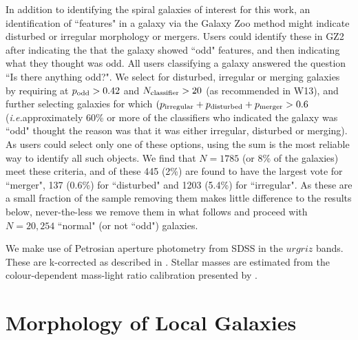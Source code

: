 \documentclass[usenatbib]{mn2e}
\newcommand{\ie}{{\it i.e.}}
\begin{document}
In addition to identifying the spiral galaxies of interest for this work, an identification of ``features" in a galaxy via the Galaxy Zoo method might indicate disturbed or irregular morphology or mergers. Users could identify these in GZ2 after indicating the that the galaxy showed ``odd" features, and then indicating what they thought was odd. All users classifying a galaxy answered the question ``Is there anything odd?". We select for disturbed, irregular or merging galaxies by requiring at $p_{\rm odd} > 0.42$ and $N_{\rm classifier}>20$ (as recommended in W13), and further selecting galaxies for which $(p_{\rm irregular}+p_{\rm disturbed} + p_{\rm merger} > 0.6$ (\ie approximately 60\% or more of the classifiers who indicated the galaxy was ``odd" thought the reason was that it was either irregular, disturbed or merging). As users could select only one of these options, using the sum is the most reliable way to identify all such objects. We find that {$N=1785$ (or 8\% of  the galaxies) meet these criteria, and of these 445 (2\%) are found to have the largest vote for ``merger", 137 (0.6\%)  for ``disturbed" and 1203 (5.4\%) for ``irregular"}. As these are a small fraction of the sample removing them makes little difference to the results below, never-the-less we remove them in what follows and proceed with {$N=20,254$} ``normal" (or not ``odd") galaxies. 

We make use of Petrosian aperture photometry from SDSS in the $urgriz$ bands. These are k-corrected as described in \citet{Bamford2009}. Stellar masses are estimated from the colour-dependent mass-light ratio calibration presented by \citet{Baldry2008}. 

\section{Morphology of Local Galaxies} \label{demographics}

\end{document}
